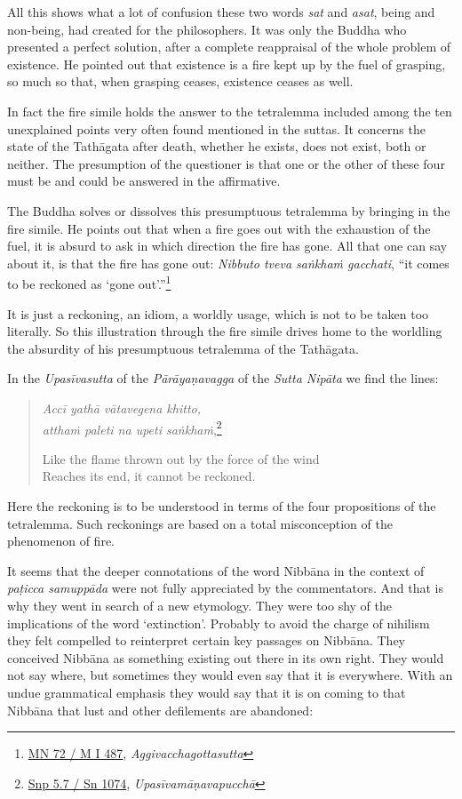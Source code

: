 All this shows what a lot of confusion these two words \emph{sat} and \emph{asat}, being and non-being, had created for the philosophers. It was only the Buddha who presented a perfect solution, after a complete reappraisal of the whole problem of existence. He pointed out that existence is a fire kept up by the fuel of grasping, so much so that, when grasping ceases, existence ceases as well.

In fact the fire simile holds the answer to the tetralemma included among the ten unexplained points very often found mentioned in the suttas. It concerns the state of the Tathāgata after death, whether he exists, does not exist, both or neither. The presumption of the questioner is that one or the other of these four must be and could be answered in the affirmative.

The Buddha solves or dissolves this presumptuous tetralemma by bringing in the fire simile. He points out that when a fire goes out with the exhaustion of the fuel, it is absurd to ask in which direction the fire has gone. All that one can say about it, is that the fire has gone out: \emph{Nibbuto tveva saṅkhaṁ gacchati}, ``it comes to be reckoned as `gone out'.''\footnote{\href{https://suttacentral.net/mn72/pli/ms}{MN 72 / M I 487}, \emph{Aggivacchagottasutta}}

It is just a reckoning, an idiom, a worldly usage, which is not to be taken too literally. So this illustration through the fire simile drives home to the worldling the absurdity of his presumptuous tetralemma of the Tathāgata.

In the \emph{Upasīvasutta} of the \emph{Pārāyaṇavagga} of the \emph{Sutta Nipāta} we find the lines:

\begin{quote}
\emph{Accī yathā vātavegena khitto,}\\
\emph{atthaṁ paleti na upeti saṅkhaṁ},\footnote{\href{https://suttacentral.net/snp5.7/pli/ms}{Snp 5.7 / Sn 1074}, \emph{Upasīvamāṇavapucchā}}

Like the flame thrown out by the force of the wind\\
Reaches its end, it cannot be reckoned.
\end{quote}

Here the reckoning is to be understood in terms of the four propositions of the tetralemma. Such reckonings are based on a total misconception of the phenomenon of fire.

It seems that the deeper connotations of the word Nibbāna in the context of \emph{paṭicca samuppāda} were not fully appreciated by the commentators. And that is why they went in search of a new etymology. They were too shy of the implications of the word `extinction'. Probably to avoid the charge of nihilism they felt compelled to reinterpret certain key passages on Nibbāna. They conceived Nibbāna as something existing out there in its own right. They would not say where, but sometimes they would even say that it is everywhere. With an undue grammatical emphasis they would say that it is on coming to that Nibbāna that lust and other defilements are abandoned:

